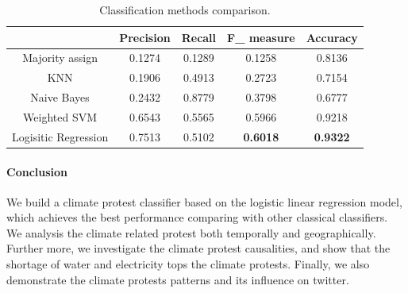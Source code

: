 \documentclass[9pt,twocolumn,twoside]{pnas-new}
\begin{document}
{\begin{table}[!ht]
\small
\caption{Classification methods comparison.}
\vspace{0.5em}
\centering
\begin{tabular}{|c | c | c | c | c |}
\hline
 & \textbf{Precision} & \textbf{Recall} & \textbf{F\_ measure} & \textbf{Accuracy}  \\ [1ex]
\hline
Majority assign   &  0.1274  &  0.1289 &  0.1258 &  0.8136  \\[1ex]
\hline
KNN &  0.1906  & 0.4913 &  0.2723 &  0.7154  \\[1ex]
\hline
Naive Bayes &  0.2432 & 0.8779 &  0.3798 &  0.6777  \\[1ex]
\hline
Weighted SVM &  0.6543 &  0.5565 & 0.5966 &  0.9218  \\[1ex]
\hline
Logisitic Regression & 0.7513 &  0.5102 &  \textbf{0.6018}&  \textbf{0.9322}  \\[1ex]
\hline
\end{tabular}
\label{table:comparision}
\end{table}


\paragraph{Conclusion} We build a climate protest classifier based on the logistic linear regression model, which achieves the best performance comparing with other classical classifiers. We analysis the climate related protest both temporally and geographically. Further more, we investigate the climate protest causalities, and show that the shortage of water and electricity tops the climate protests. Finally, we also demonstrate the climate protests patterns and its influence on twitter.

}

\showmatmethods %



\showacknow %

\pnasbreak


\end{document}
